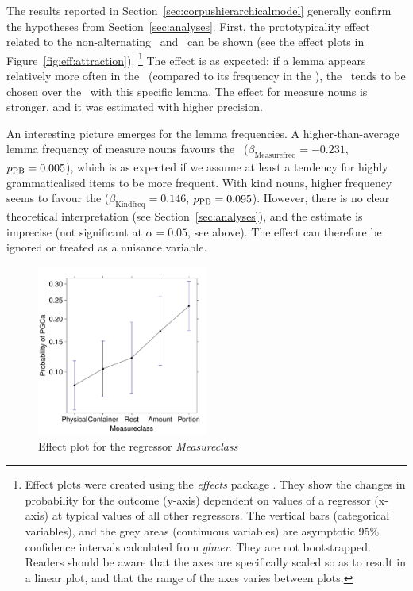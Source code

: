 The results reported in Section~\ref{sec:corpushierarchicalmodel} generally confirm the hypotheses from Section~\ref{sec:analyses}.
First, the prototypicality effect related to the non-alternating \PGCd\ and \NACb\ can be shown (see the effect plots in Figure~\ref{fig:eff:attraction}).%
\footnote{Effect plots were created using the \textit{effects} package \citep{Fox2003}.
They show the changes in probability for the outcome (y-axis) dependent on values of a regressor (x-axis) at typical values of all other regressors.
The vertical bars (categorical variables), and the grey areas (continuous variables) are asymptotic 95\% confidence intervals calculated from \textit{glmer}.
They are not bootstrapped.
Readers should be aware that the axes are specifically scaled so as to result in a linear plot, and that the range of the axes varies between plots.}
The effect is as expected:
if a lemma appears relatively more often in the \PGCd\ (compared to its frequency in the \NACb), the \PGCa\ tends to be chosen over the \NACa\ with this specific lemma.
The effect for measure nouns is stronger, and it was estimated with higher precision.

An interesting picture emerges for the lemma frequencies.
A higher-than-average lemma frequency of measure nouns favours the \NACa\ ($\beta_{\text{Measurefreq}}=-0.231$, $p_{\text{PB}}=0.005$), which is as expected if we assume at least a tendency for highly grammaticalised items to be more frequent.
With kind nouns, higher frequency seems to favour the \PGCa ($\beta_{\text{Kindfreq}}=0.146$, $p_{\text{PB}}=0.095$).
However, there is no clear theoretical interpretation (see Section~\ref{sec:analyses}), and the estimate is imprecise (not significant at $\alpha=0.05$, see above).
The effect can therefore be ignored or treated as a nuisance variable.



\begin{figure}[h!]
  \centering
  \includegraphics[width=0.5\textwidth]{../R/output/corpus_Measureclass}
  \caption{Effect plot for the regressor \textit{Measureclass}}
  \label{fig:eff:measureattraction}
\end{figure}

